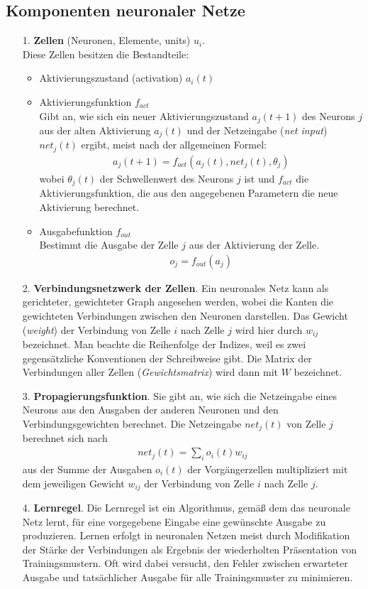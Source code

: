 \subsection{Komponenten neuronaler Netze}
\begin{itemize}
\item[1.] \textbf{Zellen} (Neuronen, Elemente, units) $u_i$.\\ Diese Zellen besitzen die Bestandteile:
\begin{itemize}[noitemsep]
\item Aktivierungszustand (activation) $a_i(t)$
\item Aktivierungsfunktion $f_{act}$\\
Gibt an, wie sich ein neuer Aktivierungszustand $a_j(t+1)$ des Neurons $j$ aus der alten Aktivierung $a_j(t)$ und der Netzeingabe (\textit{net input}) $net_j(t)$ ergibt, meist nach der allgemeinen Formel:
\begin{align*}
a_j(t+1) = f_{act}\left(a_j(t), net_j(t), \theta_j\right)
\end{align*}
wobei $\theta_j(t)$ der Schwellenwert des Neurons $j$ ist und $f_{act}$ die
Aktivierungsfunktion, die aus den angegebenen Parametern die neue
Aktivierung berechnet.
\item Ausgabefunktion $f_{out}$\\ Bestimmt die Ausgabe der Zelle $j$ aus der Aktivierung der Zelle.
\begin{align*}
o_j = f_{out}(a_j)
\end{align*}
\end{itemize}
\item[2.] \textbf{Verbindungsnetzwerk der Zellen}. Ein neuronales Netz kann als gerichteter,
gewichteter Graph angesehen werden, wobei die Kanten die gewichteten
Verbindungen zwischen den Neuronen darstellen. Das Gewicht (\textit{weight}) der
Verbindung von Zelle $i$ nach Zelle $j$ wird hier durch $w_{ij}$ bezeichnet. Man beachte
die Reihenfolge der Indizes, weil es zwei gegensätzliche Konventionen der
Schreibweise gibt. Die Matrix der Verbindungen aller Zellen (\textit{Gewichtsmatrix})
wird dann mit $W$ bezeichnet.
\item[3.] \textbf{Propagierungsfunktion}. Sie gibt an, wie sich die Netzeingabe eines Neurons aus
den Ausgaben der anderen Neuronen und den Verbindungsgewichten berechnet.
Die Netzeingabe $net_j(t)$ von Zelle $j$ berechnet sich nach
\begin{align*}
net_j(t) = \sum\limits_i o_i(t)w_{ij}
\end{align*}
aus der Summe der Ausgaben $o_i(t)$ der Vorgängerzellen multipliziert mit dem
jeweiligen Gewicht $w_{ij}$ der Verbindung von Zelle $i$ nach Zelle $j$.
\item[4.] \textbf{Lernregel}. Die Lernregel ist ein Algorithmus, gemäß dem das neuronale Netz
lernt, für eine vorgegebene Eingabe eine gewünschte Ausgabe zu produzieren.
Lernen erfolgt in neuronalen Netzen meist durch Modifikation der Stärke der
Verbindungen als Ergebnis der wiederholten Präsentation von Trainingsmustern.
Oft wird dabei versucht, den Fehler zwischen erwarteter Ausgabe und
tatsächlicher Ausgabe für alle Trainingsmuster zu minimieren. 
\end{itemize}
